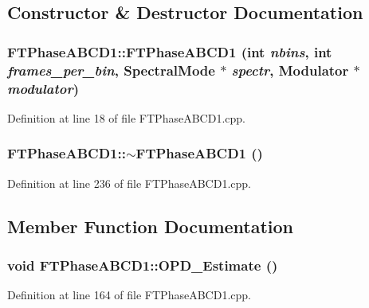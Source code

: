 \subsection{Constructor \& Destructor Documentation}
\hypertarget{classFTPhaseABCD1_a5cbce7f05ad5e81f40f3ab40ddb3faf0}{
\subsubsection[{FTPhaseABCD1}]{\setlength{\rightskip}{0pt plus 5cm}FTPhaseABCD1::FTPhaseABCD1 (int {\em nbins}, \/  int {\em frames\_\-per\_\-bin}, \/  {\bf SpectralMode} $\ast$ {\em spectr}, \/  {\bf Modulator} $\ast$ {\em modulator})}}
\label{classFTPhaseABCD1_a5cbce7f05ad5e81f40f3ab40ddb3faf0}


Definition at line 18 of file FTPhaseABCD1.cpp.

\hypertarget{classFTPhaseABCD1_adca39b254b058fc6ebc624354bec5255}{
\subsubsection[{$\sim$FTPhaseABCD1}]{\setlength{\rightskip}{0pt plus 5cm}FTPhaseABCD1::$\sim$FTPhaseABCD1 ()}}
\label{classFTPhaseABCD1_adca39b254b058fc6ebc624354bec5255}


Definition at line 236 of file FTPhaseABCD1.cpp.



\subsection{Member Function Documentation}
\hypertarget{classFTPhaseABCD1_a2b378a7f7486447bd702fece1f2b6ba3}{
\subsubsection[{OPD\_\-Estimate}]{\setlength{\rightskip}{0pt plus 5cm}void FTPhaseABCD1::OPD\_\-Estimate ()}}
\label{classFTPhaseABCD1_a2b378a7f7486447bd702fece1f2b6ba3}


Definition at line 164 of file FTPhaseABCD1.cpp.

